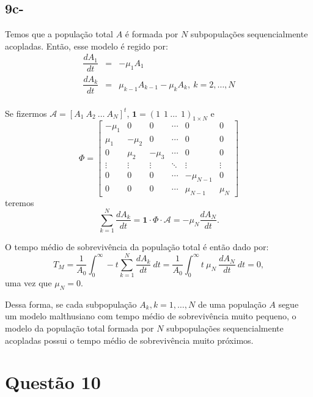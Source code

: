 {\subsection*{9c-}

Temos que a população total \(A\) é formada por \(N\) subpopulações sequencialmente acopladas. Então, esse modelo é regido por:
\[\begin{array}{rcl}
\dfrac{dA_{1}}{dt} &=& -\mu_{1} A_{1} \\[0.3cm]
\dfrac{dA_{k}}{dt} &=& \mu_{k-1} A_{k-1} - \mu_{k} A_{k},\ k = 2, \ldots, N \\[0.3cm]
\end{array}\]

Se fizermos \(\mathcal{A} = [A_1 \ A_2 \ \ldots\ A_N]^t\), \(\mathbf{1} = (1 \ \ 1 \ \ldots\ \ 1)_{1 \times N}\) e
\[\Phi
=\left[
\begin{array}{cccccc}
-\mu_{1} & 0 & 0 & \cdots & 0 & 0 \\
\mu_{1} & -\mu_{2} & 0 & \cdots & 0 & 0 \\
0 & \mu_{2} & -\mu_{3} & \cdots & 0 & 0 \\
\vdots & \vdots & \vdots & \ddots & \vdots & \vdots\\
0 & 0 & 0 & \cdots & -\mu_{N-1} & 0 \\
0 & 0 & 0 & \cdots & \mu_{N-1} & \mu_N
\end{array}\right]
\]
teremos
\[\displaystyle\sum_{k=1}^{N} \dfrac{dA_{k}}{dt}
= \mathbf{1} \cdot \Phi \cdot \mathcal{A}
= -\mu_{N} \dfrac{dA_{N}}{dt}.\]



O tempo médio de sobrevivência da população total é então dado por:
\[
T_M
= \dfrac{1}{A_0} \displaystyle\int_{0}^{\infty} -t \displaystyle\sum_{k=1}^{N} \dfrac{dA_{k}}{dt}\ dt
= \dfrac{1}{A_0} \displaystyle\int_{0}^{\infty} t\ \mu_{N}\ \dfrac{dA_{N}}{dt}\ dt
= 0,
\]
uma vez que \(\mu_N = 0\).

Dessa forma, se cada subpopulação \(A_{k}, k = 1, \ldots, N\) de uma população \(A\) segue um modelo malthusiano com tempo médio de sobrevivência muito pequeno, o modelo da população total formada por \(N\) subpopulações sequencialmente acopladas possui o tempo médio de sobrevivência muito próximos.
}

\section*{Questão 10}



